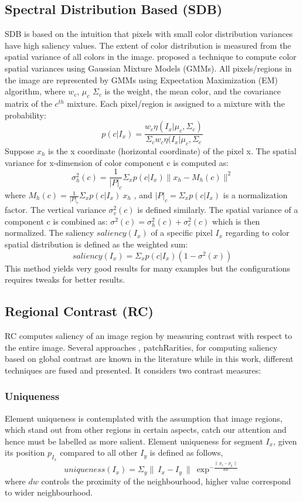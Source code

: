 \subsection{Spectral Distribution Based (SDB)} 
SDB is based on the intuition that pixels with small color distribution variances have high saliency values. The extent of color distribution is measured from the spatial variance of all colors in the image. \cite{spectralSal} proposed a technique to compute color spatial variances using Gaussian Mixture Models (GMMs). All pixels/regions in the image are represented by GMMs using Expectation Maximization (EM) algorithm, where $w_{c}$, $\mu_{c}$ $\Sigma_{c}$ is the weight, the mean color, and the covariance matrix of the $c^{th}$ mixture. Each pixel/region is assigned to a mixture with the probability:
$$p(c | I_{x}) = \frac{w_{c}\eta(I_{x}| \mu_{c},\Sigma_{c})}{\Sigma_{c}w_{c}\eta(I_{x}| \mu_{c},\Sigma_{c}} $$
Suppose $x_{h}$ is the x coordinate (horizontal coordinate) of the pixel x. The spatial variance for x-dimension of color component c is computed as:
$$\sigma_{h}^{2}(c) = \frac{1}{|P|_{c}}\Sigma_{x}	p(c | I_{x}) \parallel x_{h} -M_{h}(c) \parallel^{2}$$
where $M_{h}(c) = \frac{1}{|P|_{c}}\Sigma_{x}p(c|I_{x})~x_h$ , and $|P|_{c} = \Sigma_{x}p(c | I_{x})$ is a normalization factor. The vertical variance $\sigma_{v}^{2}(c)$ is defined similarly. The spatial variance of a component c is combined as: $\sigma^{2}(c) = \sigma_{h}^{2}(c) + \sigma_{c}^{2}(c)$ which is then normalized.
The saliency $saliency(I_{x})$ of a specific pixel $I_{x}$ regarding to color spatial
distribution is defined as the weighted sum:
$$saliency(I_{x}) = \Sigma_{x}p(c | I_{x})(1-\sigma^{2}(x))$$
This method yields very good results for many examples but the configurations requires tweaks for better results.

\subsection{Regional Contrast (RC)}
RC computes saliency of an image region by measuring contrast with respect to the entire image. Several approaches  \citep{globContrast}, {patchRarities}, \citep{salFilters} for computing saliency based on global contrast are known in the literature while in this work, different techniques are fused and presented. It considers two contrast measures:
\subsubsection{Uniqueness}
Element uniqueness is contemplated with the assumption that image regions, which stand out from other regions in certain aspects, catch our attention and hence must be labelled as more salient. Element uniqueness for segment $I_{x}$, given its position $p_{I_{x}}$ compared to all other $I_{y}$ is defined as follows,
$$uniqueness(I_{x}) = \Sigma_{y} \parallel~I_{x} -I_{y}~\parallel~\exp^{-\frac{\parallel~p_{x} - p_{y}~\parallel}{dw}}$$
where $dw$ controls the proximity of the neighbourhood, higher value correspond to wider neighbourhood.
